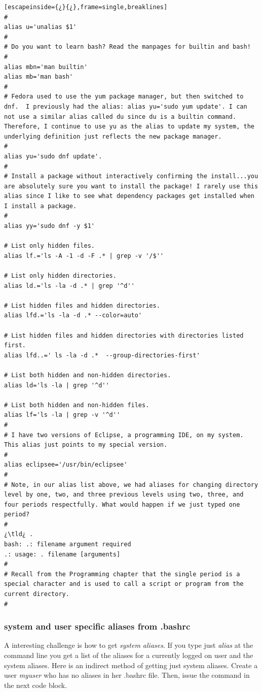 \begin{lstlisting}[escapeinside={¿}{¿},frame=single,breaklines]
#
alias u='unalias $1'
#
# Do you want to learn bash? Read the manpages for builtin and bash!
#
alias mbn='man builtin'
alias mb='man bash'
#
# Fedora used to use the yum package manager, but then switched to dnf.  I previously had the alias: alias yu='sudo yum update'. I can not use a similar alias called du since du is a builtin command. Therefore, I continue to use yu as the alias to update my system, the underlying definition just reflects the new package manager.
#
alias yu='sudo dnf update'.
#
# Install a package without interactively confirming the install...you are absolutely sure you want to install the package! I rarely use this alias since I like to see what dependency packages get installed when I install a package.
#
alias yy='sudo dnf -y $1'

# List only hidden files.
alias lf.='ls -A -1 -d -F .* | grep -v '/$''

# List only hidden directories.
alias ld.='ls -la -d .* | grep '^d''

# List hidden files and hidden directories.
alias lfd.='ls -la -d .* --color=auto'

# List hidden files and hidden directories with directories listed first.
alias lfd..=' ls -la -d .*  --group-directories-first'

# List both hidden and non-hidden directories.
alias ld='ls -la | grep '^d''

# List both hidden and non-hidden files.
alias lf='ls -la | grep -v '^d''
#
# I have two versions of Eclipse, a programming IDE, on my system. This alias just points to my special version.
#
alias eclipsee='/usr/bin/eclipsee'
#
# Note, in our alias list above, we had aliases for changing directory level by one, two, and three previous levels using two, three, and four periods respectfully. What would happen if we just typed one period?
#
¿\tld¿ .
bash: .: filename argument required
.: usage: . filename [arguments]
#
# Recall from the Programming chapter that the single period is a special character and is used to call a script or program from the current directory.
#
\end{lstlisting}

\subsubsection{system and user specific aliases from \ttb{}.bashrc}

A interesting challenge is how to get \emph{system aliases}. If you type just \textsl{alias} at the command line you get a list of the aliases for a currently logged on user and the system aliases. Here is an indirect method of getting just system aliases. Create a user \emph{myuser} who has no aliases in her \ttb{}.bashrc file. Then, issue the command in the next code block.


